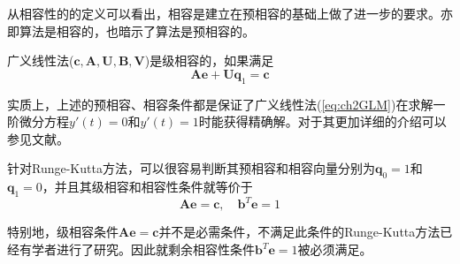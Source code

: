 从相容性的的定义可以看出，相容是建立在预相容的基础上做了进一步的要求。亦即算法是相容的，也暗示了算法是预相容的。%
\begin{definition}[级相容]
广义线性法($\bm{c},\bm{A},\bm{U},\bm{B},\bm{V}$)是级相容的\cite{Jackiewicz2009}，如果满足
\begin{equation}
\bm{Ae}+\bm{Uq}_1=\bm{c}\label{eq:ch2StageConsistent}
\end{equation}
\end{definition}%

实质上，上述的预相容、相容条件都是保证了广义线性法(\ref{eq:ch2GLM})在求解一阶微分方程$y'(t)=0$和$y'(t)=1$时能获得精确解。对于其更加详细的介绍可以参见文献。

针对Runge-Kutta方法，可以很容易判断其预相容和相容向量分别为$\bm{q}_0=1$和$\bm{q}_1=0$，并且其级相容和相容性条件就等价于
\begin{equation}
\bm{Ae}=\bm{c},\quad \bm{b}^T\bm{e}=1
\end{equation}

特别地，级相容条件$\bm{Ae}=\bm{c}$并不是必需条件，不满足此条件的Runge-Kutta方法已经有学者进行了研究\cite{Oliver1975,Zlatev1980,Dekker1984}。因此就剩余相容性条件$\bm{b}^T\bm{e}=1$被必须满足。

